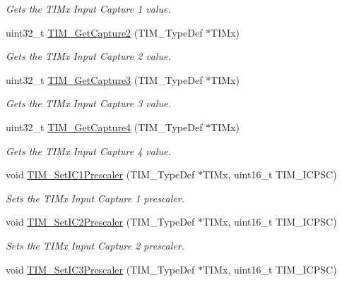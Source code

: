 \begin{DoxyCompactItemize}
\begin{DoxyCompactList}\small\item\em Gets the T\-I\-Mx Input Capture 1 value. \end{DoxyCompactList}\item 
uint32\-\_\-t \hyperlink{group___t_i_m___group3_ga2524cb5db14e388fb7f20c99fb3d58a5}{T\-I\-M\-\_\-\-Get\-Capture2} (T\-I\-M\-\_\-\-Type\-Def $\ast$T\-I\-Mx)
\begin{DoxyCompactList}\small\item\em Gets the T\-I\-Mx Input Capture 2 value. \end{DoxyCompactList}\item 
uint32\-\_\-t \hyperlink{group___t_i_m___group3_ga71ee9ce2c535ec0fb3fac5f9119221f7}{T\-I\-M\-\_\-\-Get\-Capture3} (T\-I\-M\-\_\-\-Type\-Def $\ast$T\-I\-Mx)
\begin{DoxyCompactList}\small\item\em Gets the T\-I\-Mx Input Capture 3 value. \end{DoxyCompactList}\item 
uint32\-\_\-t \hyperlink{group___t_i_m___group3_ga420b022cbc71ac603b5dd4922687abb1}{T\-I\-M\-\_\-\-Get\-Capture4} (T\-I\-M\-\_\-\-Type\-Def $\ast$T\-I\-Mx)
\begin{DoxyCompactList}\small\item\em Gets the T\-I\-Mx Input Capture 4 value. \end{DoxyCompactList}\item 
void \hyperlink{group___t_i_m___group3_gaf0f684dea88e222de9689d8ed0ca8805}{T\-I\-M\-\_\-\-Set\-I\-C1\-Prescaler} (T\-I\-M\-\_\-\-Type\-Def $\ast$T\-I\-Mx, uint16\-\_\-t T\-I\-M\-\_\-\-I\-C\-P\-S\-C)
\begin{DoxyCompactList}\small\item\em Sets the T\-I\-Mx Input Capture 1 prescaler. \end{DoxyCompactList}\item 
void \hyperlink{group___t_i_m___group3_ga3cc4869b5fe73271808512c89322a325}{T\-I\-M\-\_\-\-Set\-I\-C2\-Prescaler} (T\-I\-M\-\_\-\-Type\-Def $\ast$T\-I\-Mx, uint16\-\_\-t T\-I\-M\-\_\-\-I\-C\-P\-S\-C)
\begin{DoxyCompactList}\small\item\em Sets the T\-I\-Mx Input Capture 2 prescaler. \end{DoxyCompactList}\item 
void \hyperlink{group___t_i_m___group3_ga76f906383b8132ebe00dffadb70cf7f9}{T\-I\-M\-\_\-\-Set\-I\-C3\-Prescaler} (T\-I\-M\-\_\-\-Type\-Def $\ast$T\-I\-Mx, uint16\-\_\-t T\-I\-M\-\_\-\-I\-C\-P\-S\-C)

\end{DoxyCompactItemize}
